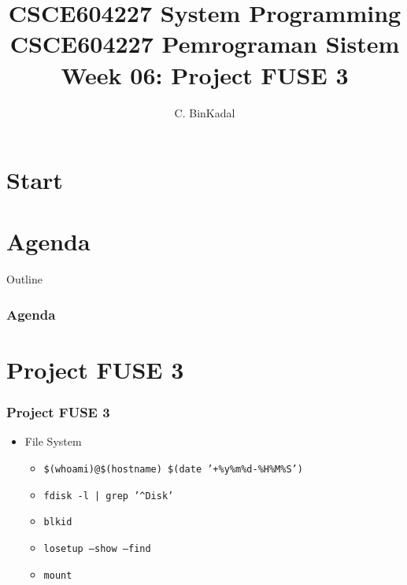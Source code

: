 \documentclass[aspectratio=169, xcolor=table, notheorems, hyperref={pdfpagelabels=false}]{beamer}
\title[\kopikopi]
{CSCE604227 System Programming \\
CSCE604227 Pemrograman Sistem \\
Week 06:
Project FUSE 3}
\author{C. BinKadal}
\institute[SDN]
{
Sendirian Berhad\\
\medskip
\url{https://sp.vlsm.org/Slides/sp06.pdf}
\\ \texttt{Always check for the latest revision!}
}
\date{\revision}
\begin{document}
\lstset{
basicstyle=\ttfamily\tiny, %
breakatwhitespace=true,
language=C,
columns=fullflexible,
keepspaces=true,
breaklines=true,
tabsize=3, 
showstringspaces=false,
extendedchars=true}

\section{Start}
\begin{frame}
\titlepage
\end{frame}




\section{Agenda}
\begin{frame}{Outline}
  \frametitle{Agenda}
  \tableofcontents[sections={1-}]
\end{frame}

\section{Project FUSE 3}
\begin{frame}[fragile]
\frametitle{Project FUSE 3}
\begin{itemize}
\item File System
\begin{itemize}
\item \texttt{\$(whoami)@\$(hostname) \$(date '+\%y\%m\%d-\%H\%M\%S')}
\item \texttt{fdisk -l | grep '\^{}Disk'}
\item \texttt{blkid}
\item \texttt{losetup --show --find}
\item \texttt{mount}
\end{itemize}
\end{itemize}
\end{frame}
\end{document}
